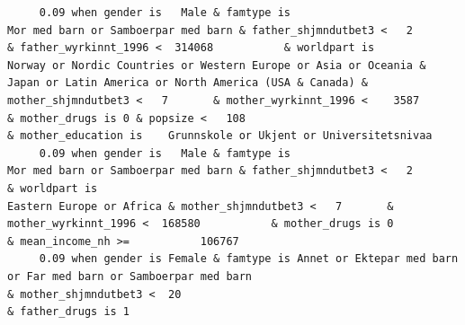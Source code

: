 \documentclass[
  letterpaper,
  DIV=11,
  numbers=noendperiod]{scrreprt}
\begin{document}
\begin{verbatim}
     0.09 when gender is   Male & famtype is                              Mor med barn or Samboerpar med barn & father_shjmndutbet3 <   2       & father_wyrkinnt_1996 <  314068           & worldpart is            Norway or Nordic Countries or Western Europe or Asia or Oceania & Japan or Latin America or North America (USA & Canada) & mother_shjmndutbet3 <   7       & mother_wyrkinnt_1996 <    3587           & mother_drugs is 0 & popsize <   108                                                                                                                                                                                & mother_education is    Grunnskole or Ukjent or Universitetsnivaa                                                                                                                                                                     
     0.09 when gender is   Male & famtype is                              Mor med barn or Samboerpar med barn & father_shjmndutbet3 <   2                                                  & worldpart is                                                                                                            Eastern Europe or Africa & mother_shjmndutbet3 <   7       & mother_wyrkinnt_1996 <  168580           & mother_drugs is 0                                                         & mean_income_nh >=           106767                                                                                                                                                                                                                                                                                                                                            
     0.09 when gender is Female & famtype is Annet or Ektepar med barn or Far med barn or Samboerpar med barn                                                                                                                                                                                                                                 & mother_shjmndutbet3 <  20                                                                                                                                                                                                                                                                                                                                                                                                & father_drugs is 1                                                                                           

\end{verbatim}
\end{document}
